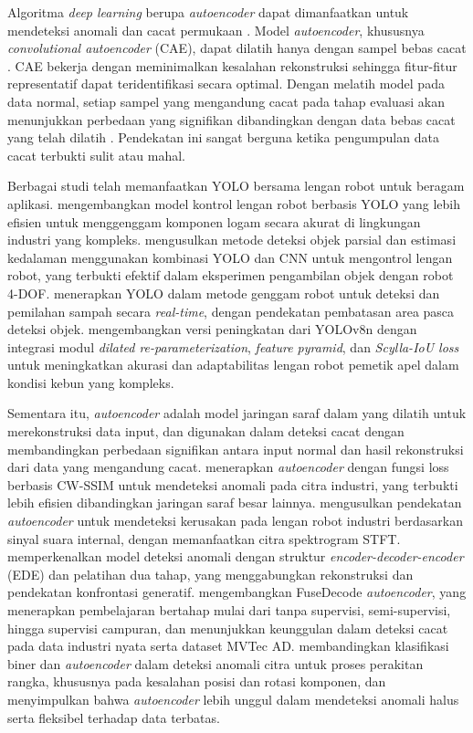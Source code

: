Algoritma \textit{deep learning} berupa \textit{autoencoder} dapat
dimanfaatkan untuk mendeteksi anomali dan cacat permukaan \citep{7}.
Model \textit{autoencoder}, khususnya \textit{convolutional autoencoder} (CAE),
dapat dilatih hanya dengan sampel bebas cacat \citep{8}. CAE bekerja
dengan meminimalkan kesalahan rekonstruksi sehingga fitur-fitur
representatif dapat teridentifikasi secara optimal. Dengan melatih
model pada data normal, setiap sampel yang mengandung cacat pada tahap
evaluasi akan menunjukkan perbedaan yang signifikan dibandingkan
dengan data bebas cacat yang telah dilatih \citep{9}. Pendekatan ini
sangat berguna ketika pengumpulan data cacat terbukti sulit atau mahal. \par

Berbagai studi telah memanfaatkan YOLO bersama lengan robot untuk
beragam aplikasi. \citet{10} mengembangkan model kontrol
lengan robot berbasis YOLO yang lebih efisien untuk menggenggam
komponen logam secara akurat di lingkungan industri yang kompleks.
\citet{11} mengusulkan metode deteksi objek
parsial dan estimasi kedalaman menggunakan kombinasi YOLO dan CNN
untuk mengontrol lengan robot, yang terbukti efektif dalam eksperimen
pengambilan objek dengan robot 4-DOF. \citet{12} menerapkan YOLO dalam
metode genggam robot untuk deteksi dan
pemilahan sampah secara \textit{real-time}, dengan pendekatan pembatasan area
pasca deteksi objek. \citet{13} mengembangkan versi
peningkatan dari YOLOv8n dengan integrasi modul \textit{dilated
re-parameterization}, \textit{feature pyramid}, dan
\textit{Scylla-IoU loss} untuk
meningkatkan akurasi dan adaptabilitas lengan robot pemetik apel
dalam kondisi kebun yang kompleks. \par

Sementara itu, \textit{autoencoder} adalah model jaringan saraf dalam yang
dilatih untuk merekonstruksi data input, dan digunakan dalam deteksi
cacat dengan membandingkan perbedaan signifikan antara input normal
dan hasil rekonstruksi dari data yang mengandung cacat. \citet{14}
menerapkan \textit{autoencoder} dengan fungsi loss berbasis CW-SSIM
untuk mendeteksi anomali pada citra industri, yang terbukti lebih
efisien dibandingkan jaringan saraf besar lainnya. \citet{15}
mengusulkan pendekatan \textit{autoencoder} untuk mendeteksi kerusakan
pada lengan robot industri berdasarkan sinyal suara internal, dengan
memanfaatkan citra spektrogram STFT. \citet{16} memperkenalkan model
deteksi anomali dengan struktur
\textit{encoder-decoder-encoder} (EDE) dan pelatihan dua tahap, yang
menggabungkan rekonstruksi dan pendekatan konfrontasi generatif.
\citet{17} mengembangkan FuseDecode \textit{autoencoder}, yang
menerapkan pembelajaran bertahap mulai dari tanpa supervisi,
semi-supervisi, hingga supervisi campuran, dan menunjukkan keunggulan
dalam deteksi cacat pada data industri nyata serta dataset MVTec AD.
\citet{18} membandingkan klasifikasi biner
dan \textit{autoencoder} dalam deteksi anomali citra untuk proses
perakitan rangka, khususnya pada kesalahan posisi dan rotasi komponen, dan
menyimpulkan bahwa \textit{autoencoder} lebih unggul dalam mendeteksi anomali
halus serta fleksibel terhadap data terbatas. \par

